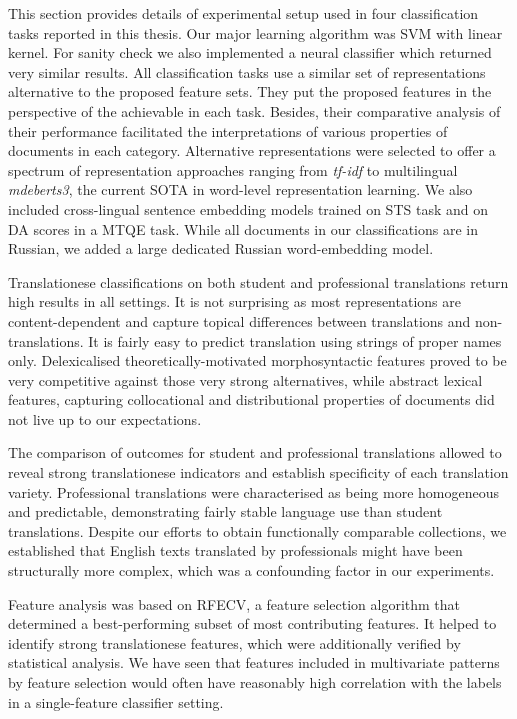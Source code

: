 This section provides details of experimental setup used in four classification tasks reported in this thesis. Our major learning algorithm was SVM with linear kernel. For sanity check we also implemented a neural classifier which returned very similar results. All classification tasks use a similar set of representations alternative to the proposed feature sets. They put the proposed features in the perspective of the achievable in each task. Besides, their comparative analysis of their performance facilitated the interpretations of various properties of documents in each category. Alternative representations were selected to offer a spectrum of representation approaches ranging from \textit{tf-idf} to multilingual \textit{mdeberts3}, the current SOTA in word-level representation learning. We also included cross-lingual sentence embedding models trained on \gls{STS} task and on DA scores in a MTQE task. While all documents in our classifications are in Russian, we added a large dedicated Russian word-embedding model.

Translationese classifications on both student and professional translations return high results in all settings. It is not surprising as most representations are content-dependent and capture topical differences between translations and non-translations. It is fairly easy to predict translation using strings of proper names only. Delexicalised theoretically-motivated morphosyntactic features proved to be very competitive against those very strong alternatives, while abstract lexical features, capturing collocational and distributional properties of documents did not live up to our expectations. 

The comparison of outcomes for student and professional translations allowed to reveal strong translationese indicators and establish specificity of each translation variety. Professional translations were characterised as being more homogeneous and predictable, demonstrating fairly stable language use than student translations. Despite our efforts to obtain functionally comparable collections, we established that English texts translated by professionals might have been structurally more complex, which was a confounding factor in our experiments.

Feature analysis was based on \gls{RFECV}, a feature selection algorithm that determined a best-performing subset of most contributing features. It helped to identify strong translationese features, which were additionally verified by statistical analysis. We have seen that features included in multivariate patterns by feature selection would often have reasonably high correlation with the labels in a single-feature classifier setting. 

